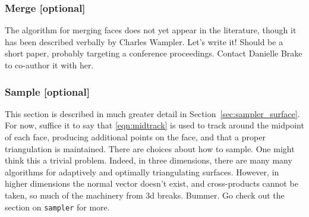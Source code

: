 \subsubsection{Merge [optional]}

The algorithm for merging faces does not yet appear in the literature, though it has been described verbally by Charles Wampler.  Let's write it!  Should be a short paper, probably targeting a conference proceedings.  Contact Danielle Brake to co-author it with her.


\subsubsection{Sample [optional]}
This section is described in much greater detail in Section~\ref{sec:sampler_surface}.  For now, suffice it to say that \eqref{eqn:midtrack} is used to track around the midpoint of each face, producing additional points on the face, and that a proper triangulation is maintained.  There are choices about how to sample.  One might think this a trivial problem.  Indeed, in three dimensions, there are many many algorithms for adaptively and optimally triangulating surfaces.  However, in higher dimensions the normal vector doesn't exist, and cross-products cannot be taken, so much of the machinery from 3d breaks.  Bummer.  Go check out the section on {\tt sampler} for more.

